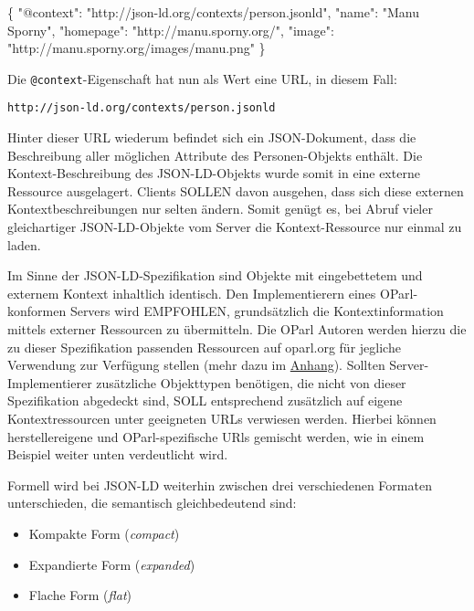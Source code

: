 \documentclass[,a4paper]{article}
\newenvironment{Shaded}{}{}
\newcommand{\DataTypeTok}[1]{\textcolor[rgb]{0.56,0.13,0.00}{{#1}}}
\newcommand{\StringTok}[1]{\textcolor[rgb]{0.25,0.44,0.63}{{#1}}}
\newcommand{\FunctionTok}[1]{\textcolor[rgb]{0.02,0.16,0.49}{{#1}}}
\begin{document}
\begin{Shaded}
\begin{Highlighting}[]
\FunctionTok{\{}
    \DataTypeTok{"@context"}\FunctionTok{:} \StringTok{"http://json-ld.org/contexts/person.jsonld"}\FunctionTok{,}
    \DataTypeTok{"name"}\FunctionTok{:} \StringTok{"Manu Sporny"}\FunctionTok{,}
    \DataTypeTok{"homepage"}\FunctionTok{:} \StringTok{"http://manu.sporny.org/"}\FunctionTok{,}
    \DataTypeTok{"image"}\FunctionTok{:} \StringTok{"http://manu.sporny.org/images/manu.png"}
\FunctionTok{\}}
\end{Highlighting}
\end{Shaded}

Die \texttt{@context}-Eigenschaft hat nun als Wert eine URL, in diesem
Fall:

\texttt{http://json-ld.org/contexts/person.jsonld}

Hinter dieser URL wiederum befindet sich ein JSON-Dokument, dass die
Beschreibung aller möglichen Attribute des Personen-Objekts enthält. Die
Kontext-Beschreibung des JSON-LD-Objekts wurde somit in eine externe
Ressource ausgelagert. Clients SOLLEN davon ausgehen, dass sich diese
externen Kontextbeschreibungen nur selten ändern. Somit genügt es, bei
Abruf vieler gleichartiger JSON-LD-Objekte vom Server die
Kontext-Ressource nur einmal zu laden.

Im Sinne der JSON-LD-Spezifikation sind Objekte mit eingebettetem und
externem Kontext inhaltlich identisch. Den Implementierern eines
OParl-konformen Servers wird EMPFOHLEN, grundsätzlich die
Kontextinformation mittels externer Ressourcen zu übermitteln. Die OParl
Autoren werden hierzu die zu dieser Spezifikation passenden Ressourcen
auf oparl.org für jegliche Verwendung zur Verfügung stellen (mehr dazu
im \hyperref[jsonldux5fressourcenux5foparlorg]{Anhang}). Sollten
Server-Implementierer zusätzliche Objekttypen benötigen, die nicht von
dieser Spezifikation abgedeckt sind, SOLL entsprechend zusätzlich auf
eigene Kontextressourcen unter geeigneten URLs verwiesen werden. Hierbei
können herstellereigene und OParl-spezifische URls gemischt werden, wie
in einem Beispiel weiter unten verdeutlicht wird.

Formell wird bei JSON-LD weiterhin zwischen drei verschiedenen Formaten
unterschieden, die semantisch gleichbedeutend sind:

\begin{itemize}
\itemsep1pt\parskip0pt
\item
  Kompakte Form (\emph{compact})
\item
  Expandierte Form (\emph{expanded})
\item
  Flache Form (\emph{flat})
\end{itemize}
\end{document}
